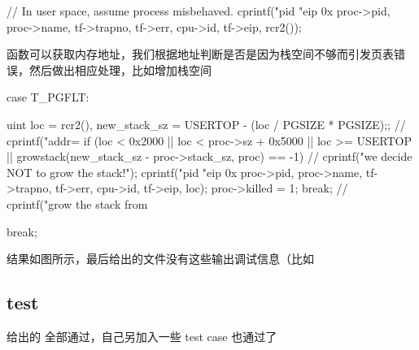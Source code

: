 \begin{ccode}
    // In user space, assume process misbehaved.
    cprintf("pid %
            "eip 0x%
            proc->pid, proc->name, tf->trapno, tf->err, cpu->id, tf->eip, 
            rcr2());
\end{ccode}

 函数可以获取内存地址，我们根据地址判断是否是因为栈空间不够而引发页表错误，然后做出相应处理，比如增加栈空间

\begin{ccode}
    case T_PGFLT:
    {
        uint loc = rcr2(), new_stack_sz = USERTOP - (loc / PGSIZE * PGSIZE);;
        // cprintf("addr=%
        if (loc < 0x2000 || loc < proc->sz + 0x5000 || 
        loc >= USERTOP || growstack(new_stack_sz - proc->stack_sz, proc) == -1) {
            // cprintf("we decide NOT to grow the stack!\n");
            cprintf("pid %
                "eip 0x%
                proc->pid, proc->name, tf->trapno, tf->err, cpu->id, tf->eip, 
                loc);
            proc->killed = 1;
            break;
        }
      // cprintf("grow the stack from %
       
    }
    break;
\end{ccode}

结果如图所示，最后给出的文件没有这些输出调试信息（比如 


\subsection{test}

给出的  全部通过，自己另加入一些 test case 也通过了

